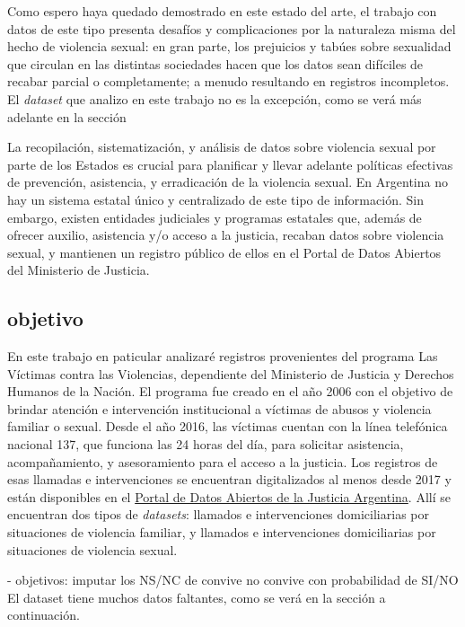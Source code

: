 \documentclass[10 pt]{article}
\begin{document}
Como espero haya quedado demostrado en este estado del arte, el trabajo con datos de este tipo presenta desafíos y complicaciones por la naturaleza misma del hecho de violencia sexual: en gran parte, los prejuicios y tabúes sobre sexualidad que circulan en las distintas sociedades hacen que los datos sean difíciles de recabar parcial o completamente; a menudo resultando en registros incompletos. El \textit{dataset} que analizo en este trabajo no es la excepción, como se verá más adelante en la sección 

La  recopilación, sistematización, y análisis de datos sobre violencia sexual por parte de los Estados es crucial para planificar y llevar adelante políticas efectivas de prevención, asistencia, y erradicación de la violencia sexual. En Argentina no hay un sistema estatal único y centralizado de este tipo de información. Sin embargo, existen entidades judiciales y programas estatales que, además de ofrecer auxilio, asistencia y/o acceso a la justicia, recaban datos sobre violencia sexual, y mantienen un registro público de ellos en el Portal de Datos Abiertos del Ministerio de Justicia.

\subsection*{objetivo}



En este trabajo en paticular analizaré registros provenientes del programa Las Víctimas contra las Violencias, dependiente del Ministerio de Justicia y Derechos Humanos de la Nación. El programa fue creado en el año 2006 con el objetivo de brindar atención e intervención institucional a víctimas de abusos y violencia familiar o sexual. Desde el año 2016, las víctimas cuentan con la línea telefónica nacional 137, que funciona las 24 horas del día, para solicitar asistencia, acompañamiento, y asesoramiento para el acceso a la justicia. Los registros de esas llamadas e intervenciones se encuentran digitalizados al menos desde 2017 y están disponibles en el \href{http://datos.jus.gob.ar/}{Portal de Datos Abiertos de la Justicia Argentina}. Allí se encuentran dos tipos de \textit{datasets}: llamados e intervenciones domiciliarias por situaciones de violencia familiar, y llamados e intervenciones domiciliarias por situaciones de violencia sexual. 




- objetivos: imputar los NS/NC de convive no convive con probabilidad de SI/NO 
El dataset tiene muchos datos faltantes, como se verá en la sección  a continuación.
\end{document}
